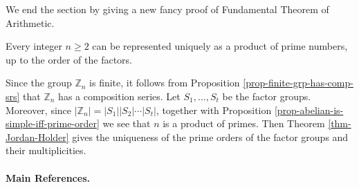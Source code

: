 We end the section by giving a new fancy  proof of Fundamental Theorem of Arithmetic.
\begin{corollary}
	Every integer $n \geq 2$ can be represented uniquely as a product of prime numbers, up to the order of the factors.
\end{corollary}

\begin{sketch}
	Since the group $\mathbb{Z}_n$ is finite, it follows from Proposition \ref{prop-finite-grp-has-comp-srs} that $\mathbb{Z}_n$ has a composition series. Let $S_1, \dots, S_t$ be the factor groups.  Moreover, since $|\mathbb{Z}_n| = |S_1| |S_2| \cdots |S_t|$, together with Proposition \ref{prop-abelian-is-simple-iff-prime-order} we see that $n$ is a product of primes. Then Theorem \ref{thm-Jordan-Holder}  gives the uniqueness of the prime orders of the factor groups and their multiplicities.
\end{sketch}

\begin{comment}
	
\subsection{Jordan-Holder Theorem for Operator Groups}

	\begin{definition}
		A pair $(\Omega, G)$ consisting of a set $\Omega$ and a group $G$ is called a \textbf{group with an operator domain $\Omega$} if there is a function $\theta$ from $\Omega$ into $\operatorname{End} G$, the set of endomorphisms of $G$. The function $\theta$ is said to be an \textbf{action} of $\Omega$ on $G$; each element of $\Omega$ is called an \textbf{operator}.
	\end{definition}
	

	A group with an operator domain $\Omega$ is often simply called an \textbf{$\Omega$-group}. If $\sigma \in \Omega$, $\theta(\sigma)$ is an endomorphism of $G$; we write $\theta(\sigma)x = \sigma x$. Sometimes, the action $\theta$ is not explicitly mentioned.
	
	\begin{example}
		If a group $Q$ is an operator group on $G$, then the pair $(Q, G)$ is a group with the operator domain $Q$.
	\end{example}
	
	In general, an operator domain $\Omega$ need not be a group. Even if $\Omega$ has some structure, the action $\theta$ need not transport this structure into $\text{End } G$.
	
	
	\begin{definition}
		Let $G$ be an $\Omega$-group. A subgroup $H$ of $G$ is said to be \textbf{$\Omega$-invariant}, or an \textbf{$\Omega$-subgroup}, if $\sigma H \in H$ for all $\sigma \in \Omega$.
	\end{definition} 


\end{comment}

\paragraph{Main References.} \cite{Lang2002,Suzuki1982,DummitFoote2004,Li2025,Rotman2015}


